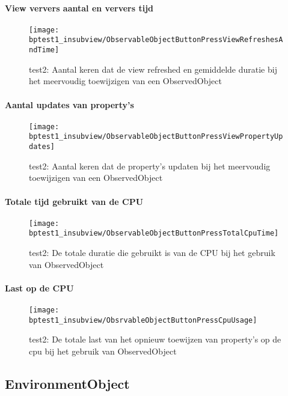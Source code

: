 \paragraph{View ververs aantal en ververs tijd}
\begin{figure}[H]
    \centering
    \texttt{[image: bptest1\_insubview/ObservableObjectButtonPressViewRefreshesAndTime]} 
    \caption{test2: Aantal keren dat de view refreshed en gemiddelde duratie bij het meervoudig toewijzigen van een ObservedObject}
    \label{fig:viewRefresheObservedObject1}
\end{figure}
\paragraph{Aantal updates van property's}
\begin{figure}[H]
    \centering
    \texttt{[image: bptest1\_insubview/ObservableObjectButtonPressViewPropertyUpdates]} 
    \caption{test2: Aantal keren dat de property's updaten bij het meervoudig toewijzigen van een ObservedObject}
    \label{fig:propertyUpdatesObservedObject1}
\end{figure}
\paragraph{Totale tijd gebruikt van de CPU}
\begin{figure}[H]
    \centering
    \texttt{[image: bptest1\_insubview/ObservableObjectButtonPressTotalCpuTime]} 
    \caption{test2: De totale duratie die gebruikt is van de CPU bij het gebruik van ObservedObject}
    \label{fig:cpuUsageTimeObservedObject1}
\end{figure}
\paragraph{Last op de CPU}
\begin{figure}[H]
    \centering
    \texttt{[image: bptest1\_insubview/ObsrvableObjectButtonPressCpuUsage]} 
    \caption{test2: De totale last van het opnieuw toewijzen van property's op de cpu bij het gebruik van ObservedObject}
    \label{fig:cpuWeightObservedObject1}
\end{figure}

\subsection{EnvironmentObject}
